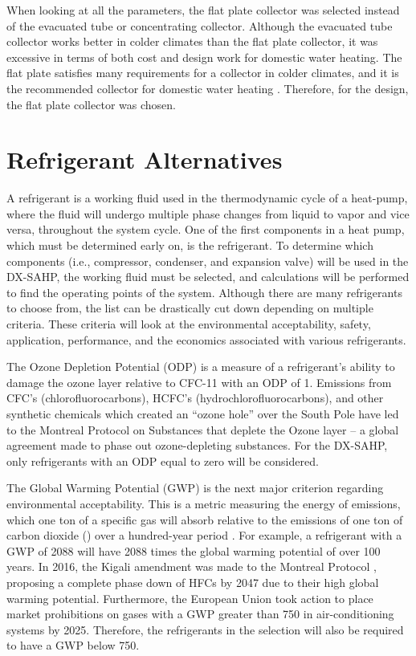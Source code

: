\medskip
When looking at all the parameters, the flat plate collector was selected instead of the evacuated tube or concentrating collector. Although the evacuated tube collector works better in colder climates than the flat plate collector, it was excessive in terms of both cost and design work for domestic water heating. The flat plate satisfies many requirements for a collector in colder climates, and it is the recommended collector for domestic water heating \cite{flat_plate}. Therefore, for the design, the flat plate collector was chosen.

\section{Refrigerant Alternatives}

A refrigerant is a working fluid used in the thermodynamic cycle of a heat-pump, where the fluid will undergo multiple phase changes from liquid to vapor and vice versa, throughout the system cycle. One of the first components in a heat pump, which must be determined early on, is the refrigerant. To determine which components (i.e., compressor, condenser, and expansion valve) will be used in the DX-SAHP, the working fluid must be selected, and calculations will be performed to find the operating points of the system. Although there are many refrigerants to choose from, the list can be drastically cut down depending on multiple criteria. These criteria will look at the environmental acceptability, safety, application, performance, and the economics associated with various refrigerants.

\medskip
The Ozone Depletion Potential (ODP) is a measure of a refrigerant’s ability to damage the ozone layer relative to CFC-11 with an ODP of 1. Emissions from CFC’s (chlorofluorocarbons), HCFC’s (hydrochlorofluorocarbons), and other synthetic chemicals which created an “ozone hole” over the South Pole \cite{ozone_layer} have led to the Montreal Protocol on Substances that deplete the Ozone layer \cite{odp} – a global agreement made to phase out ozone-depleting substances. For the DX-SAHP, only refrigerants with an ODP equal to zero will be considered.

\medskip
The Global Warming Potential (GWP) is the next major criterion regarding environmental acceptability. This is a metric measuring the energy of emissions, which one ton of a specific gas will absorb relative to the emissions of one ton of carbon dioxide () over a hundred-year period \cite{gwp}. For example, a refrigerant with a GWP of 2088 will have 2088 times the global warming potential of  over 100 years. In 2016, the Kigali amendment was made to the Montreal Protocol \cite{montreal_protocol}, proposing a complete phase down of HFCs by 2047 due to their high global warming potential. Furthermore, the European Union \cite{hfcs} took action to place market prohibitions on gases with a GWP greater than 750 in air-conditioning systems by 2025. Therefore, the refrigerants in the selection will also be required to have a GWP below 750.

